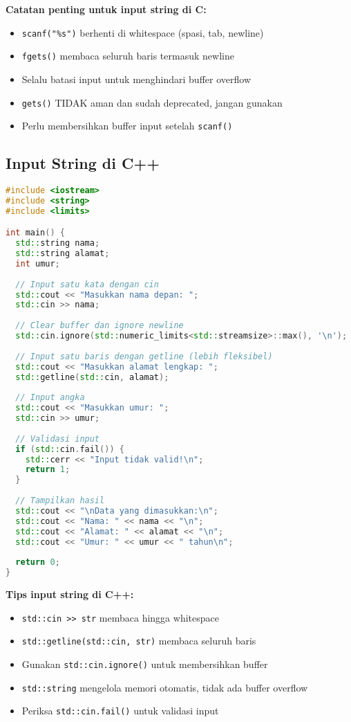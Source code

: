 \documentclass[../main.tex]{subfiles}
\begin{document}
\textbf{Catatan penting untuk input string di C:}
\begin{itemize}
  \item \texttt{scanf("\%s")} berhenti di whitespace (spasi, tab, newline)
  \item \texttt{fgets()} membaca seluruh baris termasuk newline
  \item Selalu batasi input untuk menghindari buffer overflow
  \item \texttt{gets()} TIDAK aman dan sudah deprecated, jangan gunakan
  \item Perlu membersihkan buffer input setelah \texttt{scanf()}
\end{itemize}

\subsection{Input String di C++}

\begin{lstlisting}[language=C++, caption={Input string di C++}]
#include <iostream>
#include <string>
#include <limits>

int main() {
  std::string nama;
  std::string alamat;
  int umur;
  
  // Input satu kata dengan cin
  std::cout << "Masukkan nama depan: ";
  std::cin >> nama;
  
  // Clear buffer dan ignore newline
  std::cin.ignore(std::numeric_limits<std::streamsize>::max(), '\n');
  
  // Input satu baris dengan getline (lebih fleksibel)
  std::cout << "Masukkan alamat lengkap: ";
  std::getline(std::cin, alamat);
  
  // Input angka
  std::cout << "Masukkan umur: ";
  std::cin >> umur;
  
  // Validasi input
  if (std::cin.fail()) {
    std::cerr << "Input tidak valid!\n";
    return 1;
  }
  
  // Tampilkan hasil
  std::cout << "\nData yang dimasukkan:\n";
  std::cout << "Nama: " << nama << "\n";
  std::cout << "Alamat: " << alamat << "\n";
  std::cout << "Umur: " << umur << " tahun\n";
  
  return 0;
}
\end{lstlisting}

\textbf{Tips input string di C++:}
\begin{itemize}
  \item \texttt{std::cin >> str} membaca hingga whitespace
  \item \texttt{std::getline(std::cin, str)} membaca seluruh baris
  \item Gunakan \texttt{std::cin.ignore()} untuk membersihkan buffer
  \item \texttt{std::string} mengelola memori otomatis, tidak ada buffer overflow
  \item Periksa \texttt{std::cin.fail()} untuk validasi input
\end{itemize}
\end{document}
